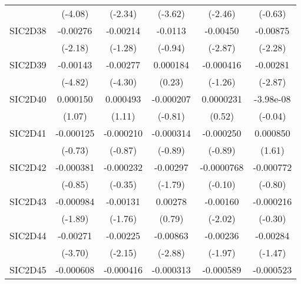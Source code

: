 \begin{table}[htbp]
\begin{tabular}{l*{5}{c}}
            &     (-4.08)         &     (-2.34)         &     (-3.62)         &     (-2.46)         &     (-0.63)         \\
SIC2D38     &    -0.00276\sym{*}  &    -0.00214         &     -0.0113         &    -0.00450\sym{**} &    -0.00875\sym{*}  \\
            &     (-2.18)         &     (-1.28)         &     (-0.94)         &     (-2.87)         &     (-2.28)         \\
SIC2D39     &    -0.00143\sym{***}&    -0.00277\sym{***}&    0.000184         &   -0.000416         &    -0.00281\sym{**} \\
            &     (-4.82)         &     (-4.30)         &      (0.23)         &     (-1.26)         &     (-2.87)         \\
SIC2D40     &    0.000150         &    0.000493         &   -0.000207         &   0.0000231         &   -3.98e-08         \\
            &      (1.07)         &      (1.11)         &     (-0.81)         &      (0.52)         &     (-0.04)         \\
SIC2D41     &   -0.000125         &   -0.000210         &   -0.000314         &   -0.000250         &    0.000850         \\
            &     (-0.73)         &     (-0.87)         &     (-0.89)         &     (-0.89)         &      (1.61)         \\
SIC2D42     &   -0.000381         &   -0.000232         &    -0.00297         &  -0.0000768         &   -0.000772         \\
            &     (-0.85)         &     (-0.35)         &     (-1.79)         &     (-0.10)         &     (-0.80)         \\
SIC2D43     &   -0.000984         &    -0.00131         &     0.00278         &    -0.00160\sym{*}  &   -0.000216         \\
            &     (-1.89)         &     (-1.76)         &      (0.79)         &     (-2.02)         &     (-0.30)         \\
SIC2D44     &    -0.00271\sym{***}&    -0.00225\sym{*}  &    -0.00863\sym{**} &    -0.00236\sym{*}  &    -0.00284         \\
            &     (-3.70)         &     (-2.15)         &     (-2.88)         &     (-1.97)         &     (-1.47)         \\
SIC2D45     &   -0.000608\sym{**} &   -0.000416         &   -0.000313         &   -0.000589         &   -0.000523         \\

\end{tabular}
\end{table}

